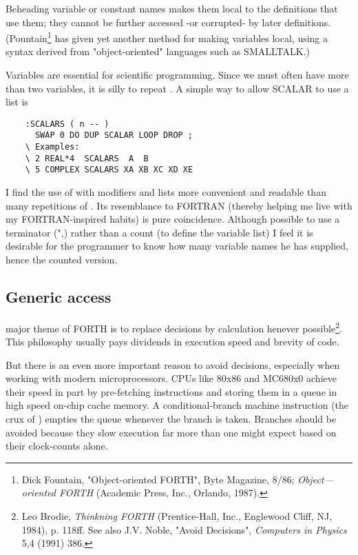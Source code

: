 Beheading variable or constant names makes them local to the definitions that use them; they cannot be further accessed -or corrupted- by later definitions. (Pountain\footnote{Dick Fountain, "Object-oriented FORTH", Byte Magazine, 8/86; \textit{Object—oriented FORTH} (Academic Press, Inc., Orlando, 1987).} has given yet another method for making variables local, using a syntax derived from "object-oriented" languages such as SMALLTALK.)

Variables are essential for scientific programming. Since we must often have more than two variables, it is silly to repeat . A simple way to allow SCALAR to use a list is

\begin{lstlisting}
    :SCALARS ( n -- )
      SWAP 0 DO DUP SCALAR LOOP DROP ;
    \ Examples:
    \ 2 REAL*4  SCALARS  A  B
    \ 5 COMPLEX SCALARS XA XB XC XD XE
\end{lstlisting}

I find the use of  with modifiers and lists more convenient and readable than many repetitions of . Its resemblance to FORTRAN (thereby helping me live with my FORTRAN-inspired habits) is pure coincidence. Although possible to use a terminator (",\eg) rather than a count (to define the variable list) I feel it is desirable for the programmer to know how many variable names he has supplied, hence the counted version.

\subsection{Generic access}
 major theme of FORTH is to replace decisions by calculation henever possible\footnote{Leo Brodie, \textit{Thinkning FORTH} (Prentice-Hall, Inc., Englewood Cliff, NJ, 1984), p. 118ff. See also J.V. Noble, "Avoid Decisions", \textit{Computers in Physics} 5,4 (1991) 386.}. This philosophy usually pays dividends in execution speed and brevity of code.

But there is an even more important reason to avoid  decisions, especially when working with modern microprocessors. CPUs like 80x86 and MC680x0 achieve their speed in part by pre-fetching instructions and storing them in a queue in high speed on-chip cache memory. A conditional-branch machine instruction (the crux of ) empties the queue whenever the branch is taken. Branches should be avoided because they slow execution far more than one might expect based on their clock-counts alone.


